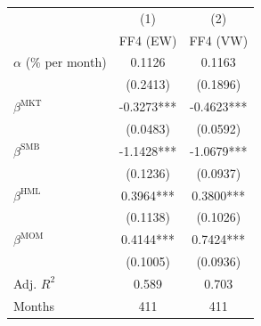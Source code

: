 \begin{tabular}{lcc}
\toprule
 & (1) & (2) \\
 & FF4 (EW) & FF4 (VW) \\
\midrule
$\alpha$ (\% per month) & 0.1126 & 0.1163 \\
 & (0.2413) & (0.1896) \\
$\beta^{\mathrm{MKT}}$ & -0.3273*** & -0.4623*** \\
 & (0.0483) & (0.0592) \\
$\beta^{\mathrm{SMB}}$ & -1.1428*** & -1.0679*** \\
 & (0.1236) & (0.0937) \\
$\beta^{\mathrm{HML}}$ & 0.3964*** & 0.3800*** \\
 & (0.1138) & (0.1026) \\
$\beta^{\mathrm{MOM}}$ & 0.4144*** & 0.7424*** \\
 & (0.1005) & (0.0936) \\
\midrule
Adj. $R^2$ & 0.589 & 0.703 \\
Months & 411 & 411 \\
\bottomrule
\end{tabular}
